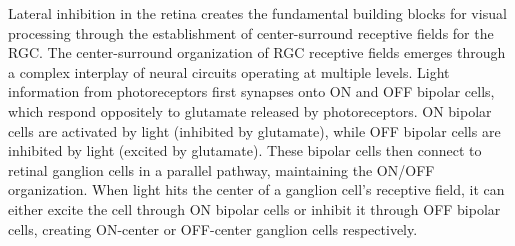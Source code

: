 Lateral inhibition in the retina creates the fundamental building blocks for visual processing through the establishment of center-surround receptive fields for the RGC. The center-surround organization of RGC receptive fields emerges through a complex interplay of neural circuits operating at multiple levels. Light information from photoreceptors first synapses onto ON and OFF bipolar cells, which respond oppositely to glutamate released by photoreceptors. ON bipolar cells are activated by light (inhibited by glutamate), while OFF bipolar cells are inhibited by light (excited by glutamate). These bipolar cells then connect to retinal ganglion cells in a parallel pathway, maintaining the ON/OFF organization. When light hits the center of a ganglion cell's receptive field, it can either excite the cell through ON bipolar cells or inhibit it through OFF bipolar cells, creating ON-center or OFF-center ganglion cells respectively. 
